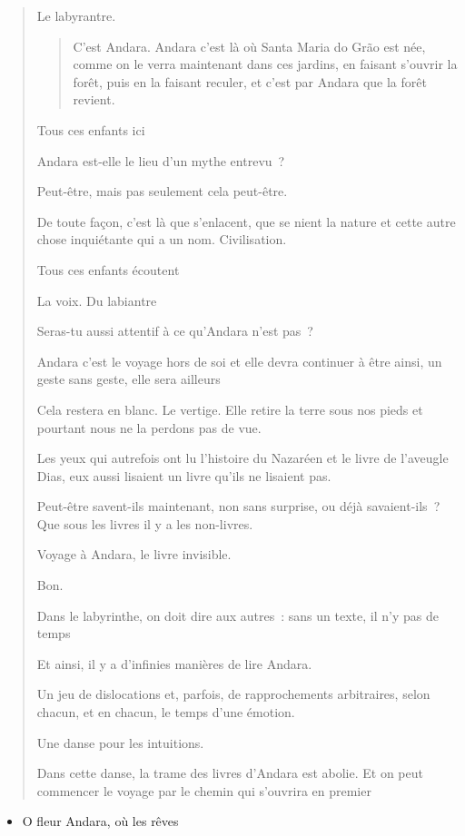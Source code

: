 \begin{quote}
Le labyrantre.

\begin{quote}
C'est Andara. Andara c'est là où Santa Maria do Grão est née, comme on
le verra maintenant dans ces jardins, en faisant s'ouvrir la forêt, puis
en la faisant reculer, et c'est par Andara que la forêt revient.
\end{quote}

Tous ces enfants ici

Andara est-elle le lieu d'un mythe entrevu~?

Peut-être, mais pas seulement cela peut-être.

De toute façon, c'est là que s'enlacent, que se nient la nature et cette
autre chose inquiétante qui a un nom. Civilisation.

Tous ces enfants écoutent

La voix. Du labiantre

Seras-tu aussi attentif à ce qu'Andara n'est pas~?

Andara c'est le voyage hors de soi et elle devra continuer à être ainsi,
un geste sans geste, elle sera ailleurs

Cela restera en blanc. Le vertige. Elle retire la terre sous nos pieds
et pourtant nous ne la perdons pas de vue.

Les yeux qui autrefois ont lu l'histoire du Nazaréen et le livre de
l'aveugle Dias, eux aussi lisaient un livre qu'ils ne lisaient pas.

Peut-être savent-ils maintenant, non sans surprise, ou déjà
savaient-ils~? Que sous les livres il y a les non-livres.

Voyage à Andara, le livre invisible.

Bon.

Dans le labyrinthe, on doit dire aux autres~: sans un texte, il n'y pas
de temps

Et ainsi, il y a d'infinies manières de lire Andara.

Un jeu de dislocations et, parfois, de rapprochements arbitraires, selon
chacun, et en chacun, le temps d'une émotion.

Une danse pour les intuitions.

Dans cette danse, la trame des livres d'Andara est abolie. Et on peut
commencer le voyage par le chemin qui s'ouvrira en premier
\end{quote}

\begin{itemize}
\item
  O fleur Andara, où les rêves
\end{itemize}

